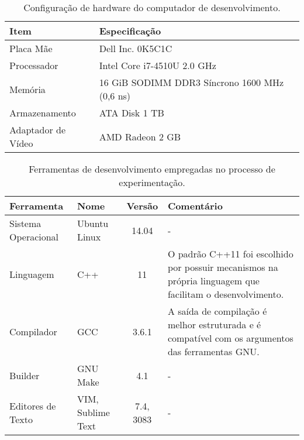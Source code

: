 \begin{table}[!ht]
\centering
\begin{tabular}{ll}
\toprule
\textbf{Item}        & \textbf{Especificação}                        \\ \midrule
Placa Mãe            & Dell Inc. 0K5C1C                              \\ 
\rowcolor[gray]{0.9}
Processador          & Intel Core i7-4510U 2.0 GHz                   \\ 
Memória              & 16 GiB SODIMM DDR3 Síncrono 1600 MHz (0,6 ns) \\ 
\rowcolor[gray]{0.9}
Armazenamento        & ATA Disk 1 TB                                  \\ 
Adaptador de Vídeo   & AMD Radeon 2 GB                        \\ \bottomrule
\end{tabular}
\caption{Configuração de hardware do computador de desenvolvimento.}
\label{table:config}
\end{table}

%
%
\begin{table}[!ht]
\centering
    \begin{tabularx}{0.95\textwidth}{llcX}
    \toprule
        \textbf{Ferramenta} & {\textbf{Nome}} & \textbf{Versão} & \textbf{Comentário}  \\
    \midrule
        Sistema Operacional  & Ubuntu Linux      & 14.04     & -                                                                                                         \\ 
        \rowcolor[gray]{0.9}
        Linguagem            & C++               & 11        & O padrão C++11 foi escolhido por possuir mecanismos na própria linguagem que facilitam o desenvolvimento. \\
        Compilador           & GCC               & 3.6.1     & A saída de compilação é melhor estruturada e é compatível com os argumentos das ferramentas GNU.          \\
        \rowcolor[gray]{0.9}
        Builder              & GNU Make          & 4.1       & -                                                                                                         \\
        Editores de Texto    & VIM, Sublime Text & 7.4, 3083 & -                                                                                                         \\
    \bottomrule
    
    \end{tabularx}
\caption{Ferramentas de desenvolvimento empregadas no processo de experimentação.}
\label{table:tools}

\end{table}

